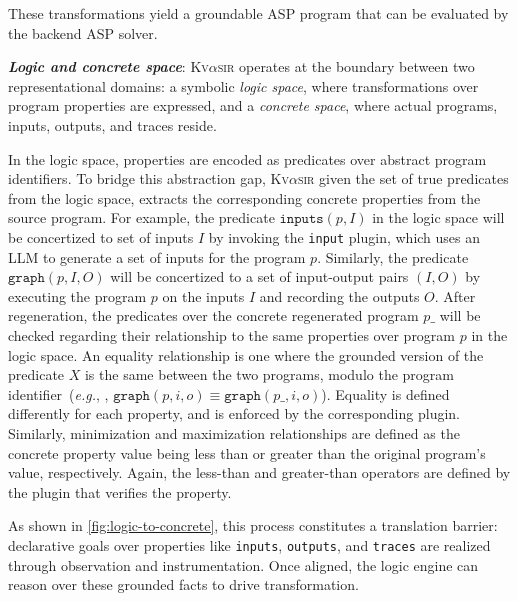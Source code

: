 \documentclass[nonacm,sigplan,review]{acmart}
\def\eg{{\em e.g.}, }
\newcommand{\sys}{{\scshape Kv{$\alpha$}sir}\xspace}
\newcommand{\heading}[1]{\vspace{2pt}\noindent\textbf{\emph{#1}}:\enspace}
\begin{document}
These transformations yield a groundable ASP program that can be evaluated by the backend ASP solver.

\heading{Logic and concrete space}
\sys operates at the boundary between two representational domains: a symbolic
\emph{logic space}, where transformations over program properties are expressed, and
a \emph{concrete space}, where actual programs, inputs, outputs, and traces
reside.

In the logic space, properties are encoded as predicates over abstract program
identifiers.
To bridge this abstraction gap, \sys given the set of true predicates
from the logic space, extracts the corresponding concrete properties from the
source program.
For example, the predicate $\texttt{inputs}(p, I)$ in the logic space
will be concertized to set of inputs $I$ by invoking the \texttt{input} plugin,
which uses an LLM to generate a set of inputs for the program $p$.
Similarly, the predicate $\texttt{graph}(p, I, O)$ will be concertized to a set of
input-output pairs $(I, O)$ by executing the program $p$ on the inputs $I$ and
recording the outputs $O$.
After regeneration, the predicates over the concrete regenerated program $p\_$
will be checked regarding their relationship to the same properties over program $p$
in the logic space.
An equality relationship is one where the grounded version of the predicate
$X$ is the same between the two programs, modulo the program identifier~(\eg, $\texttt{graph}(p, i, o) \equiv \texttt{graph}(p\_, i, o)$).
Equality is defined differently for each property, and is enforced by the corresponding plugin.
Similarly, minimization and maximization relationships are defined as
the concrete property value being less than or greater than the original program's value, respectively.
Again, the less-than and greater-than operators are defined by the plugin that verifies the property.


As shown in \cref{fig:logic-to-concrete}, this process constitutes a
translation barrier: declarative goals over properties like \texttt{inputs},
\texttt{outputs}, and \texttt{traces} are realized through observation and
instrumentation. Once aligned, the logic engine can reason over these grounded
facts to drive transformation.
\end{document}
